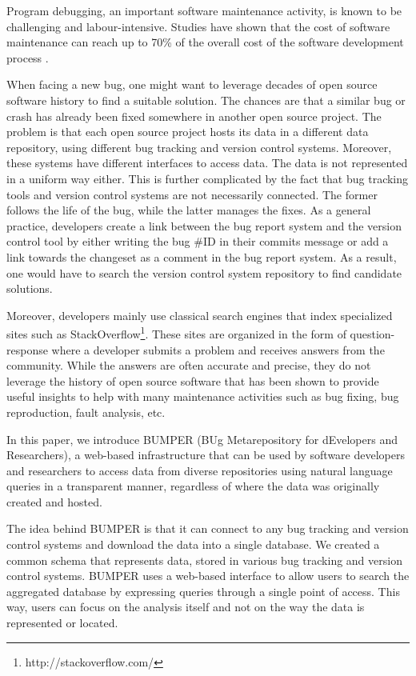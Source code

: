 \documentclass[conference]{IEEEtran}
\begin{document}
Program debugging, an important software maintenance activity, is known to be challenging and labour-intensive. Studies have shown that the cost of software maintenance can reach up to 70\% of the overall cost of the software development process \cite{Pressman2005}.

When facing a new bug, one might want to leverage decades of open source software history to find a suitable solution. The chances are that a similar bug or crash has already been fixed somewhere in another open source project. The problem is that each open source project hosts its data in a different data repository, using different bug tracking and version control systems. Moreover, these systems have different interfaces to access data.
The data is not represented in a uniform way either. This is further complicated by the fact that bug tracking tools and version control systems are not necessarily connected. The former follows the life of the bug, while the latter manages the fixes. As a general practice, developers create a link between the bug report system and the version control tool by either writing the bug \#ID in their commits message or add a link towards the changeset as a comment in the bug report system. As a result, one would have to search the version control system repository to find candidate solutions.

Moreover, developers mainly use classical search engines that index specialized sites such as StackOverflow\footnote{http://stackoverflow.com/}. These sites are organized in the form of question-response where a developer submits a problem and receives answers from the community. While the answers are often accurate and precise, they do not leverage the history of open source software that has been shown to provide useful insights to help with many maintenance activities such as bug fixing\cite{Saha2014}, bug reproduction\cite{Nayrolles2015c}, fault analysis\cite{Nessa2008}, etc.

In this paper, we introduce BUMPER (BUg Metarepository for dEvelopers and Researchers), a web-based infrastructure that can be used by software developers and researchers to access data from diverse repositories using natural language queries in a transparent manner, regardless of where the data was originally created and hosted.

The idea behind BUMPER is that it can connect to any bug tracking and version control systems and download the data into a single database. We created a common schema that represents data, stored in various bug tracking and version control systems. BUMPER uses a web-based interface to allow users to search the aggregated database by expressing queries through a single point of access. This way, users can focus on the analysis itself and not on the way the data is represented or located.
\end{document}
